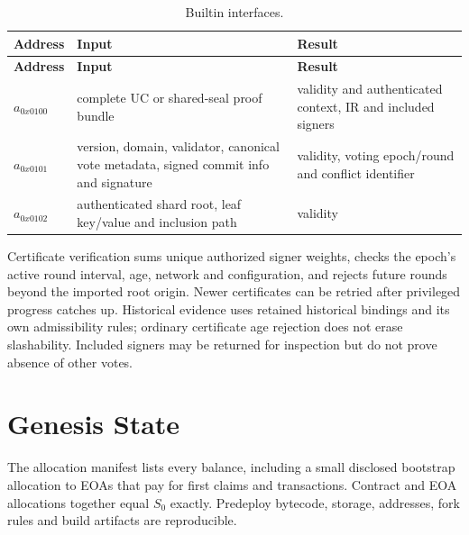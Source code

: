 \begin{longtable}{p{2.0cm}p{5.2cm}p{6.0cm}}
\caption{Builtin interfaces.}\label{ta:evm-builtins}\\
\textbf{Address} & \textbf{Input} & \textbf{Result}\\ \hline
\endfirsthead
\textbf{Address} & \textbf{Input} & \textbf{Result}\\ \hline
\endhead
$a_{0x0100}$ & complete UC or shared-seal proof bundle & validity and authenticated context, IR and included signers\\
$a_{0x0101}$ & version, domain, validator, canonical vote metadata, signed commit info and signature & validity, voting epoch/round and conflict identifier\\
$a_{0x0102}$ & authenticated shard root, leaf key/value and inclusion path & validity\\
\end{longtable}

Certificate verification sums unique authorized signer weights, checks the epoch's active round interval, age, network and configuration, and rejects future rounds beyond the imported root origin. Newer certificates can be retried after privileged progress catches up. Historical evidence uses retained historical bindings and its own admissibility rules; ordinary certificate age rejection does not erase slashability. Included signers may be returned for inspection but do not prove absence of other votes.

\section{Genesis State}\label{app:evm-genesis}

The allocation manifest lists every balance, including a small disclosed bootstrap allocation to EOAs that pay for first claims and transactions. Contract and EOA allocations together equal $S_0$ exactly. Predeploy bytecode, storage, addresses, fork rules and build artifacts are reproducible.

